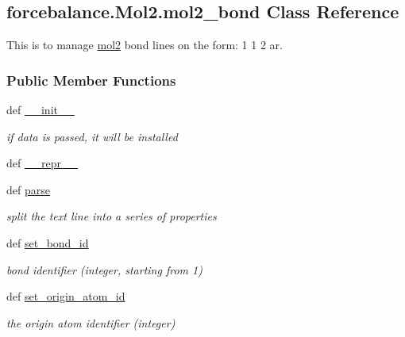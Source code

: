 \hypertarget{classforcebalance_1_1Mol2_1_1mol2__bond}{\subsection{forcebalance.\-Mol2.\-mol2\-\_\-bond Class Reference}
\label{classforcebalance_1_1Mol2_1_1mol2__bond}
}


This is to manage \hyperlink{classforcebalance_1_1Mol2_1_1mol2}{mol2} bond lines on the form\-: 1 1 2 ar.  


\subsubsection*{Public Member Functions}
\begin{DoxyCompactItemize}
\item 
def \hyperlink{classforcebalance_1_1Mol2_1_1mol2__bond_a093622f1fda304a18ee25b232ba2f998}{\-\_\-\-\_\-init\-\_\-\-\_\-}
\begin{DoxyCompactList}\small\item\em if data is passed, it will be installed \end{DoxyCompactList}\item 
def \hyperlink{classforcebalance_1_1Mol2_1_1mol2__bond_adb17d4278c0063cf557807b77f2cb3e1}{\-\_\-\-\_\-repr\-\_\-\-\_\-}
\item 
def \hyperlink{classforcebalance_1_1Mol2_1_1mol2__bond_a66ca9cb935bd3a9a1f41335d85d39b2f}{parse}
\begin{DoxyCompactList}\small\item\em split the text line into a series of properties \end{DoxyCompactList}\item 
def \hyperlink{classforcebalance_1_1Mol2_1_1mol2__bond_a7e8bcec38c5dd62a0c672ad855388ce0}{set\-\_\-bond\-\_\-id}
\begin{DoxyCompactList}\small\item\em bond identifier (integer, starting from 1) \end{DoxyCompactList}\item 
def \hyperlink{classforcebalance_1_1Mol2_1_1mol2__bond_a6116c2ff70b27afcd3acd507861496ae}{set\-\_\-origin\-\_\-atom\-\_\-id}
\begin{DoxyCompactList}\small\item\em the origin atom identifier (integer) \end{DoxyCompactList}\item 

\end{DoxyCompactItemize}
